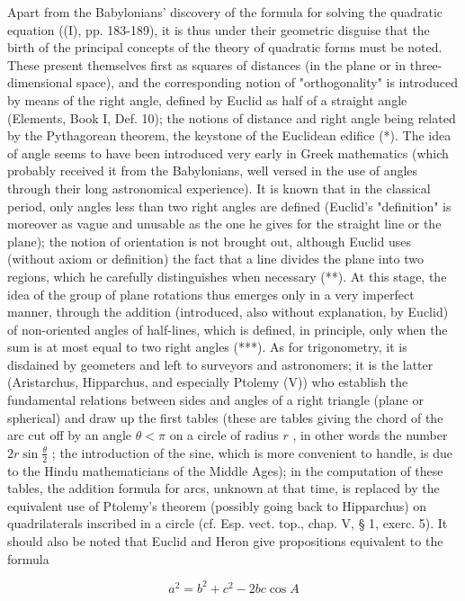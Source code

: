 Apart from the Babylonians' discovery of the formula for solving the quadratic equation ((I), pp. 183-189), it is thus under their geometric disguise that the birth of the principal concepts of the theory of quadratic forms must be noted. These present themselves first as squares of distances (in the plane or in three-dimensional space), and the corresponding notion of "orthogonality" is introduced by means of the right angle, defined by Euclid as half of a straight angle (Elements, Book I, Def. 10); the notions of distance and right angle being related by the Pythagorean theorem, the keystone of the Euclidean edifice (*). The idea of angle seems to have been introduced very early in Greek mathematics (which probably received it from the Babylonians, well versed in the use of angles through their long astronomical experience). It is known that in the classical period, only angles less than two right angles are defined (Euclid's "definition" is moreover as vague and unusable as the one he gives for the straight line or the plane); the notion of orientation is not brought out, although Euclid uses (without axiom or definition) the fact that a line divides the plane into two regions, which he carefully distinguishes when necessary (**). At this stage, the idea of the group of plane rotations thus emerges only in a very imperfect manner, through the addition (introduced, also without explanation, by Euclid) of non-oriented angles of half-lines, which is defined, in principle, only when the sum is at most equal to two right angles (***). As for trigonometry, it is disdained by geometers and left to surveyors and astronomers; it is the latter (Aristarchus, Hipparchus, and especially Ptolemy (V)) who establish the fundamental relations between sides and angles of a right triangle (plane or spherical) and draw up the first tables (these are tables giving the chord of the arc cut off by an angle \(\theta < \pi\) on a circle of radius \(r\) , in other words the number \(2r \sin \frac{\theta}{2}\) ; the introduction of the sine, which is more convenient to handle, is due to the Hindu mathematicians of the Middle Ages); in the computation of these tables, the addition formula for arcs, unknown at that time, is replaced by the equivalent use of Ptolemy's theorem (possibly going back to Hipparchus) on quadrilaterals inscribed in a circle (cf. Esp. vect. top., chap. V, § 1, exerc. 5). It should also be noted that Euclid and Heron give propositions equivalent to the formula

\[
a ^ {2} = b ^ {2} + c ^ {2} - 2 b c \cos A
\]

